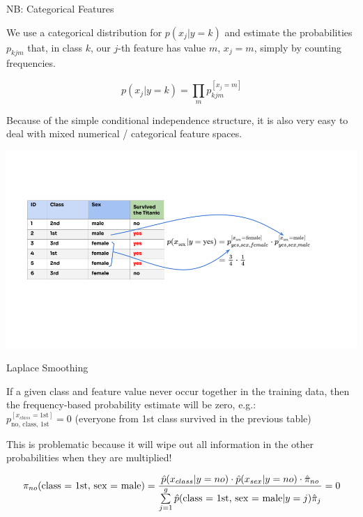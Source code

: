 \documentclass[11pt,compress,t,notes=noshow, xcolor=table]{beamer}
\begin{document}
\begin{frame}{NB: Categorical Features}

We use a categorical distribution for $p(x_j | y = k)$ and estimate the probabilities $p_{kjm}$ that, in class $k$, our $j$-th feature has value $m$, $x_j = m$, simply by counting  frequencies.

$$
p(x_j | y = k) = \prod_m p_{kjm}^{[x_j = m]}
$$

Because of the simple conditional independence structure, it is also very easy to deal with mixed numerical / categorical feature spaces.

\begin{flushright}
\includegraphics[width=\textwidth, clip = true, trim = {50 410 120 350}]{figure_man/nb-categorial_final.png}
\end{flushright}

\end{frame}

\begin{vbframe}{Laplace Smoothing}
\begin{small}
If a given class and feature value never occur together in the training data, then the frequency-based probability estimate will be zero, e.g.:\\
$p_{\text{no, class, 1st}}^{[x_{class} = \text{1st}]} = 0$ (everyone from 1st class survived in the previous table)

\lz


This is problematic because it will wipe out all information in the other probabilities when they are multiplied!

$$
\pi_{no} (\text{class = 1st, sex = male}) = \frac{\hat{p}(x_{class} | y = no) \cdot \hat{p}(x_{sex} | y = no)\cdot \pikh[no]}{\sumjg \hat{p}(\text{class = 1st, sex = male} | y = j)\pih_j} = 0
$$



\lz


\end{small}

\end{vbframe}
\end{document}
